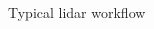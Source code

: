 \documentclass[xcolor={dvipsnames,usenames},beamer,aspectratio=169]{beamer}
\begin{document}
\begin{frame}{Typical lidar workflow}
\begin{columns}
\begin{column}{0.45\textwidth}












\end{column}
\end{columns}

\end{frame}
\end{document}

